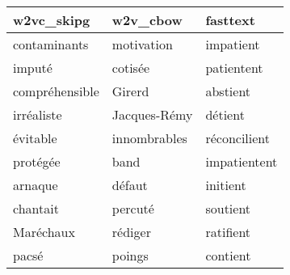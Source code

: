 \begin{tabular}{lll}
\toprule
     w2vc\_skipg &      w2v\_cbow &      fasttext \\
\midrule
   contaminants &    motivation &     impatient \\
         imputé &       cotisée &    patientent \\
 compréhensible &        Girerd &      abstient \\
     irréaliste &  Jacques-Rémy &       détient \\
       évitable &  innombrables &  réconcilient \\
       protégée &          band &  impatientent \\
        arnaque &        défaut &      initient \\
       chantait &       percuté &      soutient \\
      Maréchaux &       rédiger &     ratifient \\
          pacsé &        poings &      contient \\
\bottomrule
\end{tabular}
